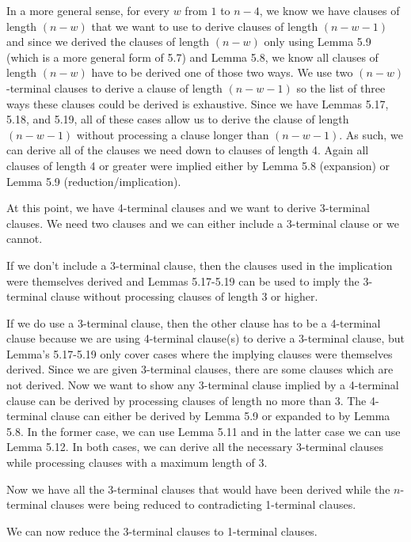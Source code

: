 \documentclass[manuscript]{acmart}
\begin{document}
    In a more general sense, for every $w$ from $1$ to $n-4$, 
    we know we have clauses of length $(n-w)$ that we want to use to
    derive clauses of length $(n-w-1)$ and since we derived the clauses
    of length $(n-w)$ only using Lemma 5.9 (which is a more general form
    of 5.7) and Lemma 5.8, we know all clauses of length $(n-w)$ have to
    be derived one of those two ways. We use two $(n-w)$-terminal clauses to 
    derive a clause of length $(n-w-1)$ so the list of three ways these
    clauses could be derived is exhaustive. Since we have Lemmas 5.17, 
    5.18, and 5.19, all of these cases allow us to derive the clause
    of length $(n-w-1)$ without processing a clause longer than $(n-w-1)$.
    As such, we can derive all of the clauses we need down to clauses
    of length 4. Again all clauses of length 4 or greater were
    implied either by Lemma 5.8 (expansion) or Lemma 5.9 (reduction/implication).

    At this point, we have 4-terminal clauses and we want to derive 3-terminal
    clauses. We need two clauses and we can either include a 3-terminal clause
    or we cannot.

    If we don't include a 3-terminal clause, then the clauses used in the 
    implication were themselves derived and Lemmas 5.17-5.19 can be
    used to imply the 3-terminal clause without processing clauses
    of length 3 or higher.

    If we do use a 3-terminal clause, then the other clause has to be a
    4-terminal clause because we are using 4-terminal clause(s) to derive
    a 3-terminal clause,
    but Lemma's 5.17-5.19 only cover cases where the implying clauses were
    themselves derived. Since we are given 3-terminal clauses, there are some
    clauses which are not derived. Now we want to show any 3-terminal clause
    implied by a 4-terminal clause can be derived by processing clauses of length
    no more than 3. The 4-terminal clause can either be derived by Lemma 5.9 or
    expanded to by Lemma 5.8. In the former case, we can use Lemma 5.11 and in 
    the latter case we can use Lemma 5.12. In both cases, we can derive all the 
    necessary 3-terminal clauses while processing clauses with a maximum length
    of 3.

    Now we have all the 3-terminal clauses that would have been derived
    while the $n$-terminal clauses were being reduced to contradicting 1-terminal
    clauses.

    We can now reduce the 3-terminal clauses to 1-terminal clauses.
\end{document}
